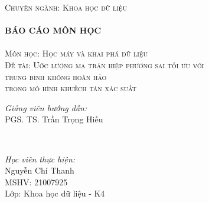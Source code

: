 \documentclass[14pt, a4paper]{article}
\numberwithin{equation}{section}
\numberwithin{figure}{section}
\numberwithin{dl}{section}
\numberwithin{md}{section}
\numberwithin{bd}{section}
\numberwithin{dn}{section}
\numberwithin{hq}{section}
\begin{document}
\begin{titlepage}
        \textsc{\Large Chuyên ngành: Khoa học dữ liệu}\\[0.5cm] %



        \HRule \\[0.4cm]
        { \huge \bfseries BÁO CÁO MÔN HỌC}\\[0.4cm] %
        \HRule \\[1.5cm]

        \textsc{\Large Môn học: Học máy và khai phá dữ liệu}\\[1cm] %


        \textsc{\Large Đề tài: Ước lượng ma trận hiệp phương sai tối ưu với \\ trung bình không hoàn hảo \\ trong mô hình khuếch tán xác suất}\\[2cm]


        \begin{minipage}{0.4\textwidth}
            \begin{flushleft} \large
            \emph{Giảng viên hướng dẫn:} \\
            PGS. TS. Trần Trọng Hiếu %
            \end{flushleft}
        \end{minipage}\\[0.5cm]

        \begin{minipage}{0.4\textwidth}
        \begin{flushleft} \large
        \emph{Học viên thực hiện:}\\
        Nguyễn Chí Thanh \\
        MSHV: 21007925 \\ %
        Lớp: Khoa học dữ liệu - K4
        \end{flushleft}
        \end{minipage}




\end{titlepage}
\end{document}
